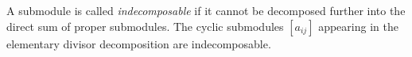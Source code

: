 A submodule is called \emph{indecomposable} if it cannot be decomposed further into the direct sum of proper submodules. The cyclic submodules $[a_{ij}]$ appearing in the elementary divisor decomposition are indecomposable.
